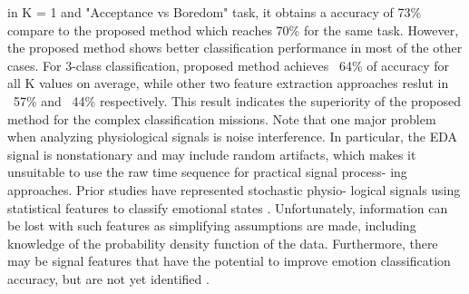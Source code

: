 in K = 1 and "Acceptance vs Boredom" task, it obtains a accuracy of 73\% compare to the proposed method which reaches
70\% for the same task. However, the proposed method shows better classification performance in most of the other
cases. For 3-class classification, proposed method achieves ~64\% of accuracy for all K values on average, while other
two feature extraction approaches reslut in ~57\% and ~44\% respectively. This result indicates the superiority of the 
proposed method for the complex classification missions. Note that one major problem when analyzing physiological signals 
is noise interference. In particular, the EDA signal is nonstationary and may include random artifacts, which makes it 
unsuitable to use the raw time sequence for practical signal process- ing approaches. Prior studies have represented 
stochastic physio- logical signals using statistical features to classify emotional states \cite{mera2004emotion}. 
Unfortunately, information can be lost with such features as simplifying assumptions are made, including knowledge 
of the probability density function of the data. Furthermore, there may be signal features that have the potential 
to improve emotion classification accuracy, but are not yet identified \cite{swangnetr2012emotional}.\\

